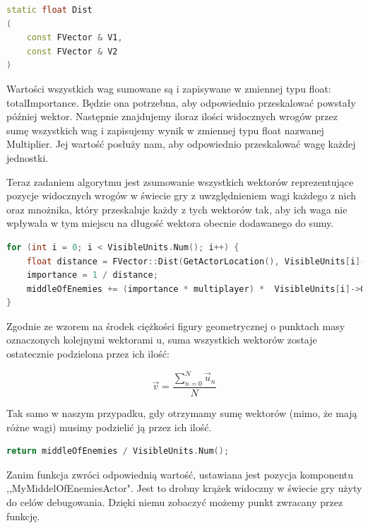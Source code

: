 \documentclass[12pt]{report}
\begin{document}
\begin{lstlisting}[language=C++, backgroundcolor=\color{black!5}, basicstyle=\footnotesize, caption=Deklaracja funkcji Dist() w klasie FVector]
static float Dist
(
    const FVector & V1,
    const FVector & V2
)
\end{lstlisting}
Wartości wszystkich wag sumowane są i zapisywane w zmiennej typu float: totalImportance. Będzie ona potrzebna, aby odpowiednio przeskalować powstały później wektor. Następnie znajdujemy iloraz ilości widocznych wrogów przez sumę wszystkich wag i zapisujemy wynik w zmiennej typu float nazwanej Multiplier. Jej wartość posłuży nam, aby odpowiednio przeskalować wagę każdej jednostki.

Teraz zadaniem algorytmu jest zsumowanie wszystkich wektorów reprezentujące pozycje widocznych wrogów w świecie gry z uwzględnieniem wagi każdego z nich oraz mnożnika, który przeskaluje każdy z tych wektorów tak, aby ich waga nie wpływała w tym miejscu na długość wektora obecnie dodawanego do sumy.
\begin{lstlisting}[language=C++, backgroundcolor=\color{black!5}, basicstyle=\footnotesize, caption=Pętla sumująca wektory pozycji wrogów z uwzględnieniem ich wag]
for (int i = 0; i < VisibleUnits.Num(); i++) {
    float distance = FVector::Dist(GetActorLocation(), VisibleUnits[i]->GetActorLocation());
	importance = 1 / distance;
	middleOfEnemies += (importance * multiplayer) *  VisibleUnits[i]->GetActorLocation();
}
\end{lstlisting}

Zgodnie ze wzorem na środek ciężkości figury geometrycznej o punktach masy oznaczonych kolejnymi wektorami u, suma wszystkich wektorów zostaje ostatecznie podzielona przez ich ilość:

$$\vec v = \dfrac{\sum_{n=0}^{N}  \vec u_n}{N}   $$

Tak samo w naszym przypadku, gdy otrzymamy sumę wektorów (mimo, że mają różne wagi) musimy podzielić ją przez ich ilość.
\begin{lstlisting}[language=C++, backgroundcolor=\color{black!5}, basicstyle=\footnotesize, caption=Wartość zwracana funkcji GetMiddleOfEnemies();]
return middleOfEnemies / VisibleUnits.Num();
\end{lstlisting}

Zanim funkcja zwróci odpowiednią wartość, ustawiana jest pozycja komponentu ,,MyMiddelOfEnemiesActor". Jest to drobny krążek widoczny w świecie gry użyty do celów debugowania. Dzięki niemu zobaczyć możemy punkt zwracany przez funkcję.
\end{document}
